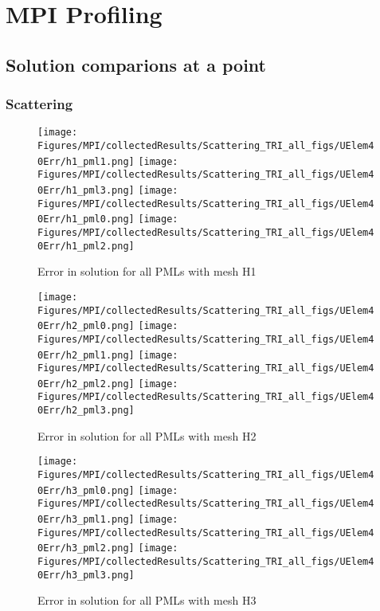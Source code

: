 \chapter{MPI Profiling} %
\label{Chapter8}

\section{Solution comparions at a point}

\subsection{Scattering}

\begin{figure}[!htb]
\texttt{[image: Figures/MPI/collectedResults/Scattering\_TRI\_all\_figs/UElem40Err/h1\_pml1.png]}
\texttt{[image: Figures/MPI/collectedResults/Scattering\_TRI\_all\_figs/UElem40Err/h1\_pml3.png]}
\texttt{[image: Figures/MPI/collectedResults/Scattering\_TRI\_all\_figs/UElem40Err/h1\_pml0.png]}
\texttt{[image: Figures/MPI/collectedResults/Scattering\_TRI\_all\_figs/UElem40Err/h1\_pml2.png]}

\caption{Error in solution for all PMLs with mesh H1}
\end{figure}

\begin{figure}[!htb]
\texttt{[image: Figures/MPI/collectedResults/Scattering\_TRI\_all\_figs/UElem40Err/h2\_pml0.png]}
\texttt{[image: Figures/MPI/collectedResults/Scattering\_TRI\_all\_figs/UElem40Err/h2\_pml1.png]}
\texttt{[image: Figures/MPI/collectedResults/Scattering\_TRI\_all\_figs/UElem40Err/h2\_pml2.png]}
\texttt{[image: Figures/MPI/collectedResults/Scattering\_TRI\_all\_figs/UElem40Err/h2\_pml3.png]}
\caption{Error in solution for all PMLs with mesh H2}
\end{figure}


\begin{figure}[!htb]
\texttt{[image: Figures/MPI/collectedResults/Scattering\_TRI\_all\_figs/UElem40Err/h3\_pml0.png]}
\texttt{[image: Figures/MPI/collectedResults/Scattering\_TRI\_all\_figs/UElem40Err/h3\_pml1.png]}
\texttt{[image: Figures/MPI/collectedResults/Scattering\_TRI\_all\_figs/UElem40Err/h3\_pml2.png]}
\texttt{[image: Figures/MPI/collectedResults/Scattering\_TRI\_all\_figs/UElem40Err/h3\_pml3.png]}
\caption{Error in solution for all PMLs with mesh H3}
\end{figure}

